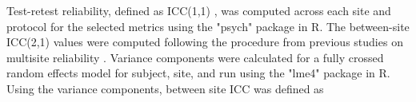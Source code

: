 Test-retest reliability, defined as ICC(1,1) \cite{fmriReliability}, was computed across each site and protocol for the selected metrics using the "psych" package in R. The between-site ICC(2,1) values were computed following the procedure from previous studies on multisite reliability \cite{fmriReliability,cannon2014}. Variance components were calculated for a fully crossed random effects model for subject, site, and run using the "lme4" package in R. Using the variance components, between site ICC was defined as